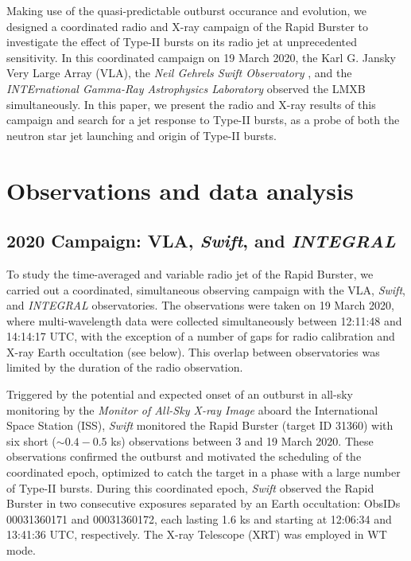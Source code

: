 \documentclass[fleqn,usenatbib]{mnras}
\begin{document}
Making use of the quasi-predictable outburst occurance and evolution, we designed a coordinated radio and X-ray campaign of the Rapid Burster to investigate the effect of Type-II bursts on its radio jet at unprecedented sensitivity. In this coordinated campaign on 19 March 2020, the Karl G. Jansky Very Large Array (VLA), the \textit{Neil Gehrels Swift Observatory} \citep[\textit{Swift};][]{gehrels2004}, and the \textit{INTErnational Gamma-Ray Astrophysics Laboratory} \citep[\textit{INTEGRAL};][]{winkler2003} observed the LMXB simultaneously. In this paper, we present the radio and X-ray results of this campaign and search for a jet response to Type-II bursts, as a probe of both the neutron star jet launching and origin of Type-II bursts. 

\section{Observations and data analysis}

\subsection{2020 Campaign: VLA, \textit{Swift}, and \textit{INTEGRAL}}
\label{sec:data_2020}

To study the time-averaged and variable radio jet of the Rapid Burster, we carried out a coordinated, simultaneous observing campaign with the VLA, \textit{Swift}, and \textit{INTEGRAL} observatories. The observations were taken on 19 March 2020, where multi-wavelength data were collected simultaneously between 12:11:48 and 14:14:17 UTC, with the exception of a number of gaps for radio calibration and X-ray Earth occultation (see below). This overlap between observatories was limited by the duration of the radio observation. 

Triggered by the potential and expected onset of an outburst in all-sky monitoring by the \textit{Monitor of All-Sky X-ray Image} \citep[\textit{MAXI};][]{matsuoka2009} aboard the International Space Station (ISS), \textit{Swift} monitored the Rapid Burster (target ID 31360) with six short ($\sim0.4 - 0.5$ ks) observations between 3 and 19 March 2020. These observations confirmed the outburst and motivated the scheduling of the coordinated epoch, optimized to catch the target in a phase with a large number of Type-II bursts. During this coordinated epoch, \textit{Swift} observed the Rapid Burster in two consecutive exposures separated by an Earth occultation: ObsIDs 00031360171 and 00031360172, each lasting 1.6 ks and starting at 12:06:34 and 13:41:36 UTC, respectively. The X-ray Telescope (XRT) was employed in WT mode. 
\end{document}
